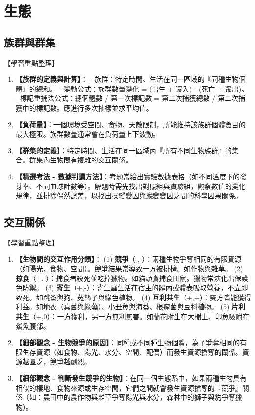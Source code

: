 \documentclass[11pt,a4paper]{article}
\begin{document}
\newpage
\section{生態}
\subsection{族群與群集}
\begin{learningpoints}{【學習重點整理】}
\begin{enumerate}[label=\arabic*.]
  \item \textbf{【族群的定義與計算】}：
  - 族群：特定時間、生活在同一區域的『同種生物個體』的總和。
  - 變動公式：族群數量變化 = (出生 + 遷入) - (死亡 + 遷出)。
  - 標記重捕法公式：總個體數 / 第一次標記數 = 第二次捕獲總數 / 第二次捕獲中的標記數。應進行多次抽樣並求平均值。
  \item \textbf{【負荷量】}：一個環境受空間、食物、天敵限制，所能維持該族群個體數目的最大極限。族群數量通常會在負荷量上下波動。
  \item \textbf{【群集的定義】}：特定時間、生活在同一區域內『所有不同生物族群』的集合。群集內生物間有複雜的交互關係。
  \item \textbf{【精選考法 - 數據判讀方法】}：考題常給出實驗數據表格（如不同溫度下的發芽率、不同血球計數等）。解題時需先找出對照組與實驗組，觀察數值的變化規律，並排除偶然誤差，以找出操縱變因與應變變因之間的科學因果關係。
\end{enumerate}
\end{learningpoints}

\subsection{交互關係}
\begin{learningpoints}{【學習重點整理】}
\begin{enumerate}[label=\arabic*.]
  \item \textbf{【生物間的交互作用分類】}：
  (1) \textbf{競爭}（-,-）：兩種生物爭奪相同的有限資源（如陽光、食物、空間）。競爭結果常導致一方被排擠。如作物與雜草。
  (2) \textbf{掠食}（+,-）：捕食者殺死並吃掉獵物。如貓頭鷹捕食田鼠。獵物常演化出保護色防禦。
  (3) \textbf{寄生}（+,-）：寄生蟲生活在宿主的體內或體表吸取營養，不立即致死。如跳蚤與狗、菟絲子與綠色植物。
  (4) \textbf{互利共生}（+,+）：雙方皆能獲得利益。如地衣（真菌與綠藻）、小丑魚與海葵、根瘤菌與豆科植物。
  (5) \textbf{片利共生}（+,0）：一方獲利，另一方無利無害。如蘭花附生在大樹上、印魚吸附在鯊魚腹部。
  \item \textbf{【細部觀念 - 生物競爭的原因】}：同種或不同種生物個體，為了爭奪相同的有限生存資源（如食物、陽光、水分、空間、配偶）而發生資源搶奪的關係。資源越匱乏，競爭越劇烈。
  \item \textbf{【細部觀念 - 判斷發生競爭的生物】}：在同一個生態系中，如果兩種生物具有相似的棲地、食物來源或生存空間，它們之間就會發生資源搶奪的『競爭』關係（如：農田中的農作物與雜草爭奪陽光與水分，森林中的獅子與豹爭奪獵物）。
\end{enumerate}
\end{learningpoints}
\end{document}
